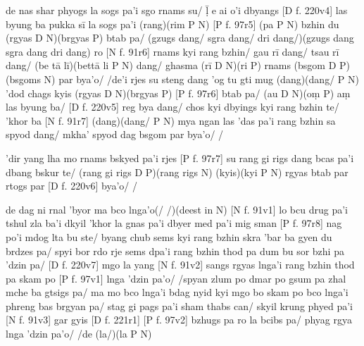 \documentclass[naipra.tex]{subfiles}
\begin{document}
de nas shar phyogs la sogs pa'i sgo rnams su/ ḹ e ai o'i dbyangs [D f. 220v4] las byung ba pukka sī la sogs pa'i (rang)(rim P N) [P f. 97r5] (pa P N) bzhin du (rgyas D N)(brgyas P) btab pa/ (gzugs dang/ sgra dang/ dri dang/)(gzugs dang sgra dang dri dang) ro [N f. 91r6] rnams kyi rang bzhin/ gau rī dang/ tsau rī dang/ (be tā lī)(bettā li P N) dang/ ghasma (rī D N)(ri P) rnams (bsgom D P)(bsgoms N) par bya'o/ /de'i rjes su steng dang 'og tu gti mug (dang)(dang/ P N) 'dod chags kyis (rgyas D N)(brgyas P) [P f. 97r6] btab pa/ (au D N)(oṃ P) aṃ las byung ba/ [D f. 220v5] reg bya dang/ chos kyi dbyings kyi rang bzhin te/ 'khor ba [N f. 91r7] (dang)(dang/ P N) mya ngan las 'das pa'i rang bzhin sa spyod dang/ mkha' spyod dag bsgom par bya'o/ /

'dir yang lha mo rnams bskyed pa'i rjes [P f. 97r7] su rang gi rigs dang bcas pa'i dbang bskur te/ (rang gi rigs D P)(rang rigs N) (kyis)(kyi P N) rgyas btab par rtogs par [D f. 220v6] bya'o/ /

de dag ni rnal 'byor ma bco lnga'o(/ /)(deest in N) [N f. 91v1] lo bcu drug pa'i tshul zla ba'i dkyil 'khor la gnas pa'i dbyer med pa'i mig sman [P f. 97r8] nag po'i mdog lta bu ste/ byang chub sems kyi rang bzhin skra 'bar ba gyen du brdzes pa/ spyi bor rdo rje sems dpa'i rang bzhin thod pa dum bu sor bzhi pa 'dzin pa/ [D f. 220v7] mgo la yang [N f. 91v2] sangs rgyas lnga'i rang bzhin thod pa skam po [P f. 97v1] lnga 'dzin pa'o/ /spyan zlum po dmar po gsum pa zhal mche ba gtsigs pa/ ma mo bco lnga'i bdag nyid kyi mgo bo skam po bco lnga'i phreng bas brgyan pa/ stag gi pags pa'i sham thabs can/ skyil krung phyed pa'i [N f. 91v3] gar gyis [D f. 221r1] [P f. 97v2] bzhugs pa ro la bcibs pa/ phyag rgya lnga 'dzin pa'o/ /de (la/)(la P N) 
\end{document}
